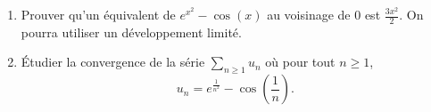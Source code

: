 \auteur{ }

\begin{enumerate}

\item Prouver qu'un équivalent de $e^{x^2}-\cos(x)$ au voisinage de $0$ est $\frac{3x^2}{2}$. On pourra utiliser un développement limité. 

\item Étudier la convergence de la série $\displaystyle   \sum_{n \geq 1} u_n$ où pour tout $n \geq 1$, $$u_n = e^{\frac{1}{n^2}}-\cos\left(\frac1n\right).$$

\end{enumerate}
